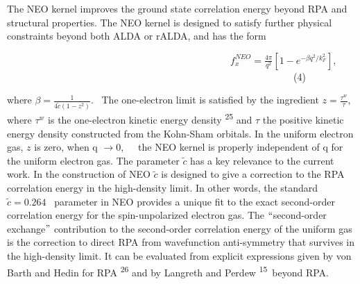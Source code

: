 \documentclass[12pt]{article}
\renewcommand{\_}{\kern-1.5pt\textunderscore\kern-1.5pt}
\begin{document}
\begin{justify}
The NEO kernel improves the ground state correlation energy beyond RPA and structural properties. The NEO kernel is designed to satisfy further physical constraints beyond both ALDA or rALDA, and has the form
\end{justify}\par


\vspace{\baselineskip}
\setlength{\parskip}{9.96pt}
\setlength{\parskip}{0.0pt}
\begin{Center}
\ \ \ \ \ \ \ \ \ \ \ \ \ \ \ \ \ \ \ \ \ \ \ \ \ \ \ \ \ \ \ \ \ \ \ \ \ \ \ \ \ \ \ \ \ \   \( f_{x}^{NEO}=\frac{4 \pi }{q^{2}} \left[ 1-e^{- \beta q^{2}/k_{F}^{2}} \right] , \) \ \ \ \ \ \ \ \ \ \ \ \ \ \ \ \ \ \ \ \ \ \ \ \ \ \ \ \ \ \ \ \ \ \ \ \ \ \ \ \ \ \ \ \ \ \ \ \ \ \ \ \ \ \ \ \ \ \ \  (4)
\end{Center}\par


\vspace{\baselineskip}
\setlength{\parskip}{9.96pt}
\setlength{\parskip}{0.0pt}
\begin{justify}
where  \(  \beta =\frac{1}{4\widetilde{c} \left( 1-z^{2} \right) }. \) \  The one-electron limit is satisfied by the ingredient  \( z=\frac{ \tau^{w}}{ \tau}, \)  where  \(  \tau^{w} \)  is the one-electron kinetic energy density \textsuperscript{25} and  \(  \tau \)  the positive kinetic energy density constructed from the Kohn-Sham orbitals. In the uniform electron gas,  \( z \)  is zero, when q \(  \rightarrow 0, \) \ \  the NEO kernel is properly independent of q for the uniform electron gas. The parameter  \( \widetilde{c} \)  has a key relevance to the current work. In the construction of NEO  \( \widetilde{c} \)  is designed to give a correction to the RPA correlation energy in the high-density limit. In other words, the standard  \( \widetilde{c}=0.264 \) \ parameter in NEO provides a unique fit to the exact second-order correlation energy for the spin-unpolarized electron gas.  The $``$second-order exchange$"$  contribution to the second-order correlation energy of the uniform gas is the correction to direct RPA from wavefunction anti-symmetry that survives in the high-density limit. It can be evaluated from explicit expressions given by von Barth and Hedin for RPA \textsuperscript{26} and by Langreth and Perdew \textsuperscript{15}\  beyond RPA.
\end{justify}\par
\end{document}
